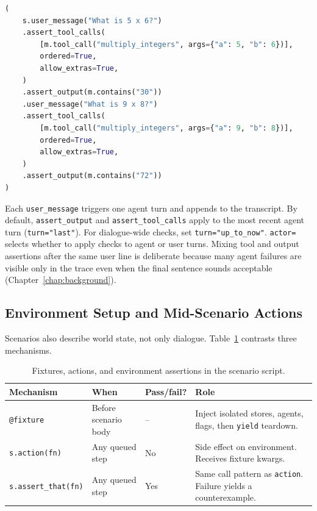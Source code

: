 \begin{lstlisting}[language=Python,caption={Two-turn scripted scenario with per-turn tool and output checks.},label=lst:multiply-dialog-scripted]
(
    s.user_message("What is 5 x 6?")
    .assert_tool_calls(
        [m.tool_call("multiply_integers", args={"a": 5, "b": 6})],
        ordered=True,
        allow_extras=True,
    )
    .assert_output(m.contains("30"))
    .user_message("What is 9 x 8?")
    .assert_tool_calls(
        [m.tool_call("multiply_integers", args={"a": 9, "b": 8})],
        ordered=True,
        allow_extras=True,
    )
    .assert_output(m.contains("72"))
)
\end{lstlisting}

Each \texttt{user\_message} triggers one agent turn and appends to the transcript. By default, \texttt{assert\_output} and \texttt{assert\_tool\_calls} apply to the most recent agent turn (\texttt{turn="last"}). For dialogue-wide checks, set \texttt{turn="up\_to\_now"}. \texttt{actor=} selects whether to apply checks to agent or user turns. Mixing tool and output assertions after the same user line is deliberate because many agent failures are visible only in the trace even when the final sentence sounds acceptable (Chapter~\ref{chap:background}).

\subsection{Environment Setup and Mid-Scenario Actions}

Scenarios also describe world state, not only dialogue. Table~\ref{tab:env-step-types} contrasts three mechanisms.

\begin{table}[htbp]
\centering
\small
\begin{tabularx}{\textwidth}{p{}p{}p{}X}
\toprule
\textbf{Mechanism} & \textbf{When} & \textbf{Pass/fail?} & \textbf{Role} \\
\midrule
\texttt{@fixture} & Before scenario body & -- &
Inject isolated stores, agents, flags, then \texttt{yield} teardown. \\
\texttt{s.action(fn)} & Any queued step & No &
Side effect on environment. Receives fixture kwargs. \\
\texttt{s.assert\_that(fn)} & Any queued step & Yes &
Same call pattern as \texttt{action}. Failure yields a counterexample. \\
\bottomrule
\end{tabularx}
\caption{Fixtures, actions, and environment assertions in the scenario script.}
\label{tab:env-step-types}
\end{table}

